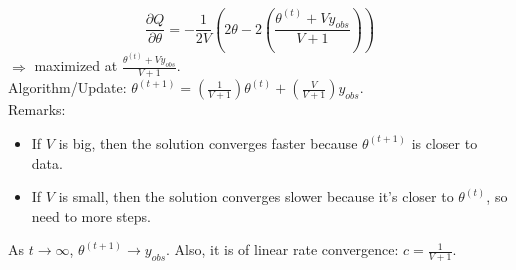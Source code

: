 \documentclass[12pt,a4paper]{article}
\begin{document}
\[
\frac{\partial Q}{\partial \theta} = -\frac{1}{2V}(2\theta - 2(\frac{\theta^{(t)}+Vy_{obs}}{V+1}))
\]
$\Rightarrow$ maximized at $\frac{\theta^{(t)}+Vy_{obs}}{V+1}$.\\
Algorithm/Update: $\theta^{(t+1)} = (\frac{1}{V+1})\theta^{(t)} + (\frac{V}{V+1})y_{obs}$.\\
Remarks:
\begin{itemize}
\item If $V$ is big, then the solution converges faster because $\theta^{(t+1)}$ is closer to data.
\item If $V$ is small, then the solution converges slower because it's closer to $\theta^{(t)}$, so need to more steps.
\end{itemize}
As $t \rightarrow \infty$, $\theta^{(t+1)} \rightarrow y_{obs}$. Also, it is of linear rate convergence: $c = \frac{1}{V+1}$.
\end{document}
